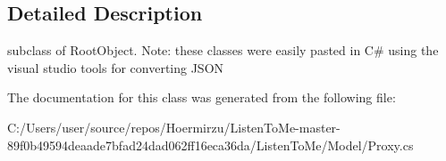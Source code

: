 \subsection{Detailed Description}
subclass of Root\+Object. Note\+: these classes were easily pasted in C\# using the visual studio tools for converting J\+S\+ON 



The documentation for this class was generated from the following file\+:\begin{DoxyCompactItemize}
\item 
C\+:/\+Users/user/source/repos/\+Hoermirzu/\+Listen\+To\+Me-\/master-\/89f0b49594deaade7bfad24dad062ff16eca36da/\+Listen\+To\+Me/\+Model/Proxy.\+cs\end{DoxyCompactItemize}
